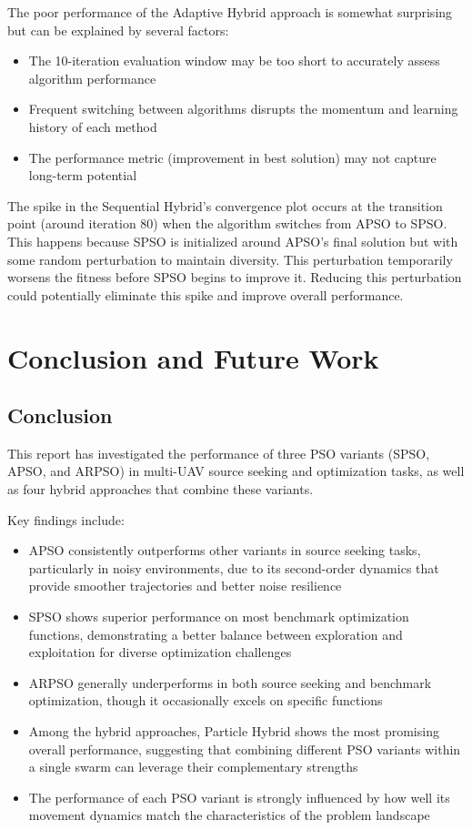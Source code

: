 \documentclass[conference]{IEEEtran}
\begin{document}
The poor performance of the Adaptive Hybrid approach is somewhat surprising but can be explained by several factors:
\begin{itemize}
    \item The 10-iteration evaluation window may be too short to accurately assess algorithm performance
    \item Frequent switching between algorithms disrupts the momentum and learning history of each method
    \item The performance metric (improvement in best solution) may not capture long-term potential
\end{itemize}

The spike in the Sequential Hybrid's convergence plot occurs at the transition point (around iteration 80) when the algorithm switches from APSO to SPSO. This happens because SPSO is initialized around APSO's final solution but with some random perturbation to maintain diversity. This perturbation temporarily worsens the fitness before SPSO begins to improve it. Reducing this perturbation could potentially eliminate this spike and improve overall performance.

\section{Conclusion and Future Work}
\subsection{Conclusion}
This report has investigated the performance of three PSO variants (SPSO, APSO, and ARPSO) in multi-UAV source seeking and optimization tasks, as well as four hybrid approaches that combine these variants.

Key findings include:

\begin{itemize}
    \item APSO consistently outperforms other variants in source seeking tasks, particularly in noisy environments, due to its second-order dynamics that provide smoother trajectories and better noise resilience
    \item SPSO shows superior performance on most benchmark optimization functions, demonstrating a better balance between exploration and exploitation for diverse optimization challenges
    \item ARPSO generally underperforms in both source seeking and benchmark optimization, though it occasionally excels on specific functions
    \item Among the hybrid approaches, Particle Hybrid shows the most promising overall performance, suggesting that combining different PSO variants within a single swarm can leverage their complementary strengths
    \item The performance of each PSO variant is strongly influenced by how well its movement dynamics match the characteristics of the problem landscape
\end{itemize}
\end{document}
